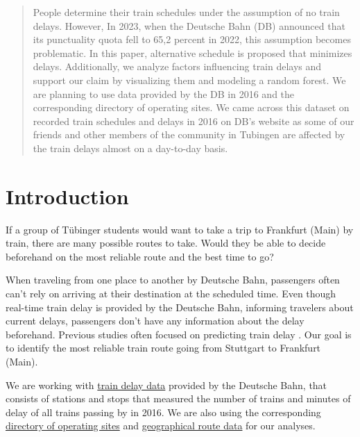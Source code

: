 \documentclass{article}
\theoremstyle{plain}
\theoremstyle{definition}
\theoremstyle{remark}
\begin{document}
\printAffiliationsAndNotice{\icmlEqualContribution} %

\begin{abstract}
People determine their train schedules under the assumption of no train delays. However, In 2023, when the Deutsche Bahn (DB) announced that its punctuality quota fell to 65,2 percent in 2022, this assumption becomes problematic. In this paper, alternative schedule is proposed that minimizes delays. Additionally, we analyze factors influencing train delays and support our claim by visualizing them and modeling a random forest. We are planning to use data provided by the DB in 2016 and the corresponding directory of operating sites. We came across this dataset on recorded train schedules and delays in 2016 on DB’s website as some of our friends and other members of the community in Tubingen are affected by the train delays almost on a day-to-day basis. 
\end{abstract}

\section{Introduction}\label{sec:intro}
If a group of Tübinger students would want to take a trip to Frankfurt (Main) by train, there are many possible routes to take. Would they be able to decide beforehand on the most reliable route and the best time to go?

When traveling from one place to another by Deutsche Bahn, passengers often can't rely on arriving at their destination at the scheduled time. Even though real-time train delay is provided by the Deutsche Bahn, informing travelers about current delays, passengers don't have any information about the delay beforehand. Previous studies often focused on predicting train delay \cite{predtraindelay}. Our goal is to identify the most reliable train route going from Stuttgart to Frankfurt (Main).

We are working with \href{https://data.deutschebahn.com/dataset/ist-verkehrsdaten-der-db-cargo-auf-bst8-ebene.html}{train delay data} provided by the Deutsche Bahn, that consists of stations and stops that measured the number of trains and minutes of delay of all trains passing by in 2016. We are also using the corresponding \href{https://data.deutschebahn.com/dataset/betriebsstellen-gueterverkehr.html}{directory of operating sites} and \href{https://data.deutschebahn.com/dataset/betriebsstellen-gueterverkehr.html}{geographical route data} for our analyses.
\end{document}
